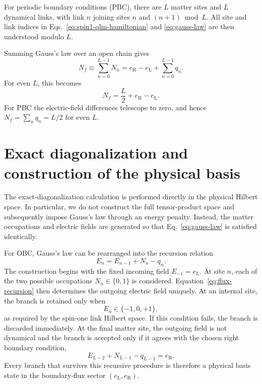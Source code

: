 For periodic boundary conditions (PBC), there are $L$ matter sites and $L$
dynamical links, with link $n$ joining sites $n$ and $(n+1)\bmod L$.  All site
and link indices in Eqs.~\eqref{eq:spin1-qlm-hamiltonian} and
\eqref{eq:gauss-law} are then understood modulo $L$.

Summing Gauss's law over an open chain gives
\begin{equation}
\label{eq:obc-total-number}
    N_f\equiv\sum_{n=0}^{L-1}N_n
    =e_{\mathrm R}-e_{\mathrm L}
    +\sum_{n=0}^{L-1}q_n.
\end{equation}
For even $L$, this becomes
\begin{equation}
    N_f=\frac{L}{2}+e_{\mathrm R}-e_{\mathrm L}.
\end{equation}
For PBC the electric-field differences telescope to zero, and hence
$N_f=\sum_nq_n=L/2$ for even $L$.

\section{Exact diagonalization and construction of the physical basis}
\label{sec:spin1-qlm-ed}

The exact-diagonalization calculation is performed directly in the physical
Hilbert space.  In particular, we do not construct the full tensor-product
space and subsequently impose Gauss's law through an energy penalty.  Instead,
the matter occupations and electric fields are generated so that
Eq.~\eqref{eq:gauss-law} is satisfied identically.

For OBC, Gauss's law can be rearranged into the recursion relation
\begin{equation}
\label{eq:flux-recursion}
    E_n=E_{n-1}+N_n-q_n.
\end{equation}
The construction begins with the fixed incoming field
$E_{-1}=e_{\mathrm L}$.  At site $n$, each of the two possible occupations
$N_n\in\{0,1\}$ is considered.  Equation~\eqref{eq:flux-recursion} then
determines the outgoing electric field uniquely.  At an internal site, the
branch is retained only when
\begin{equation}
    E_n\in\{-1,0,+1\},
\end{equation}
as required by the spin-one link Hilbert space.  If this condition fails, the
branch is discarded immediately.  At the final matter site, the outgoing
field is not dynamical and the branch is accepted only if it agrees with the
chosen right boundary condition,
\begin{equation}
    E_{L-2}+N_{L-1}-q_{L-1}=e_{\mathrm R}.
\end{equation}
Every branch that survives this recursive procedure is therefore a physical
basis state in the boundary-flux sector $(e_{\mathrm L},e_{\mathrm R})$.

